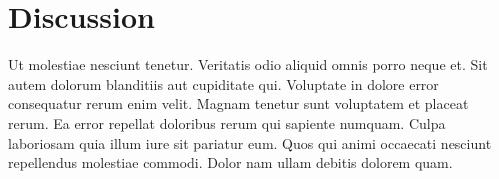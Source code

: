\newpage
\section{Discussion}

Ut molestiae nesciunt tenetur. Veritatis odio aliquid omnis porro neque et. Sit autem dolorum blanditiis aut cupiditate qui.
Voluptate in dolore error consequatur rerum enim velit. Magnam tenetur sunt voluptatem et placeat rerum. Ea error repellat doloribus rerum qui sapiente numquam. Culpa laboriosam quia illum iure sit pariatur eum. Quos qui animi occaecati nesciunt repellendus molestiae commodi. Dolor nam ullam debitis dolorem quam.